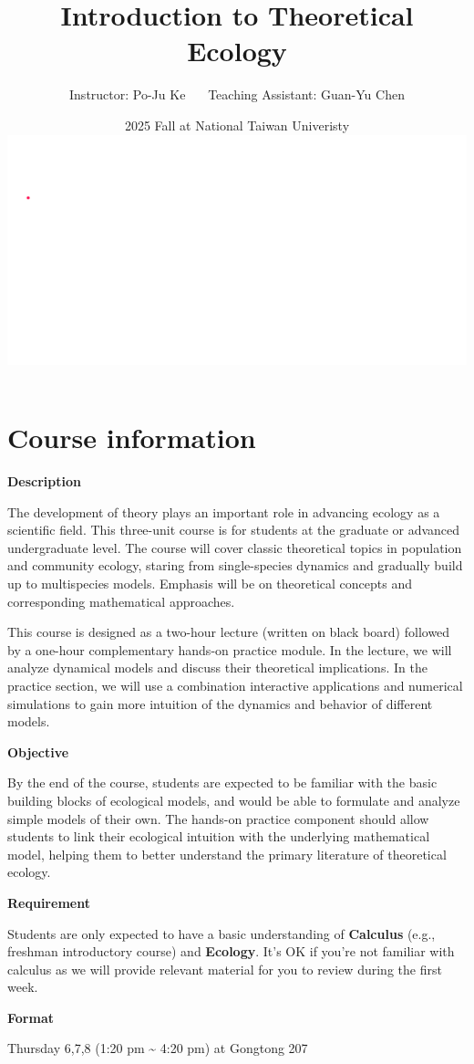 \documentclass[
]{book}
\title{Introduction to Theoretical Ecology}
\author{Instructor: Po-Ju Ke \(~~~~~\) Teaching Assistant: Guan-Yu Chen}
\date{2025 Fall at National Taiwan Univeristy \includegraphics{./bifurcation.gif}}
\begin{document}
\maketitle

{
\setcounter{tocdepth}{1}
\tableofcontents
}
\hypertarget{course-information}{%
\chapter*{Course information}\label{course-information}}

\textbf{Description}

The development of theory plays an important role in advancing ecology as a scientific field. This three-unit course is for students at the graduate or advanced undergraduate level. The course will cover classic theoretical topics in population and community ecology, staring from single-species dynamics and gradually build up to multispecies models. Emphasis will be on theoretical concepts and corresponding mathematical approaches.

This course is designed as a two-hour lecture (written on black board) followed by a one-hour complementary hands-on practice module. In the lecture, we will analyze dynamical models and discuss their theoretical implications. In the practice section, we will use a combination interactive applications and numerical simulations to gain more intuition of the dynamics and behavior of different models.

\textbf{Objective}

By the end of the course, students are expected to be familiar with the basic building blocks of ecological models, and would be able to formulate and analyze simple models of their own. The hands-on practice component should allow students to link their ecological intuition with the underlying mathematical model, helping them to better understand the primary literature of theoretical ecology.

\textbf{Requirement}

Students are only expected to have a basic understanding of \textbf{Calculus} (e.g., freshman introductory course) and \textbf{Ecology}. It's OK if you're not familiar with calculus as we will provide relevant material for you to review during the first week.

\textbf{Format}

Thursday 6,7,8 (1:20 pm \textasciitilde{} 4:20 pm) at Gongtong 207
\end{document}
